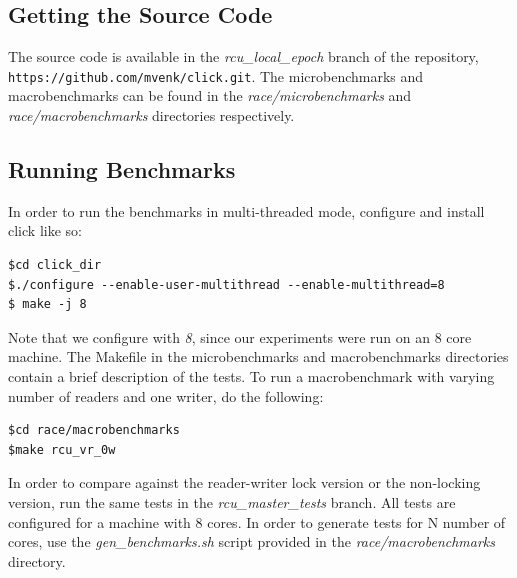 \documentclass[a4paper]{article}
\begin{document}
\subsection{Getting the Source Code}
The source code is available in the \emph{rcu\_local\_epoch} branch of the repository, \\\texttt{https://github.com/mvenk/click.git}.
The microbenchmarks and macrobenchmarks can be found in the \emph{race/microbenchmarks} and \emph{race/macrobenchmarks} directories respectively.
\subsection{Running Benchmarks}
In order to run the benchmarks in multi-threaded mode, configure and install click like so:
\begin{verbatim}
$cd click_dir
$./configure --enable-user-multithread --enable-multithread=8
$ make -j 8
\end{verbatim}
Note that we configure with \emph{8}, since our experiments were run on an 8 core machine.
The Makefile in the microbenchmarks and macrobenchmarks directories contain a brief description of the tests. To run a macrobenchmark with varying number of readers and one writer, do the following:
\begin{verbatim}
$cd race/macrobenchmarks
$make rcu_vr_0w
\end{verbatim}
In order to compare against the reader-writer lock version or the non-locking version, run the same tests in the \emph{rcu\_master\_tests} branch. All tests are configured for a machine with 8 cores. In order to generate tests for N number of cores, use the \emph{gen\_benchmarks.sh} script provided in the \emph{race/macrobenchmarks} directory.


\end{document}
